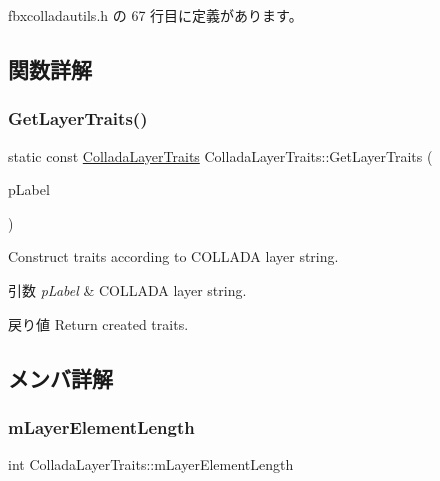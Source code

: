  fbxcolladautils.\+h の 67 行目に定義があります。



\subsection{関数詳解}
\mbox{\label{struct_collada_layer_traits_ab540128a228dc27186beca5c5dd5f707}} 
\subsubsection{\texorpdfstring{Get\+Layer\+Traits()}{GetLayerTraits()}}
{\footnotesize\ttfamily static const \hyperlink{struct_collada_layer_traits}{Collada\+Layer\+Traits} Collada\+Layer\+Traits\+::\+Get\+Layer\+Traits (\begin{DoxyParamCaption}\item[{const \hyperlink{class_fbx_string}{Fbx\+String} \&}]{p\+Label }\end{DoxyParamCaption})\hspace{0.3cm}{\ttfamily [static]}}

Construct traits according to C\+O\+L\+L\+A\+DA layer string. 
\begin{DoxyParams}{引数}
{\em p\+Label} & C\+O\+L\+L\+A\+DA layer string. \\
\hline
\end{DoxyParams}
\begin{DoxyReturn}{戻り値}
Return created traits. 
\end{DoxyReturn}


\subsection{メンバ詳解}
\mbox{\label{struct_collada_layer_traits_a101229f9fd16ad7c7e751ad716008704}} 
\subsubsection{\texorpdfstring{m\+Layer\+Element\+Length}{mLayerElementLength}}
{\footnotesize\ttfamily int Collada\+Layer\+Traits\+::m\+Layer\+Element\+Length}



